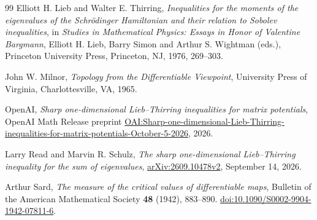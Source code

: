 \begin{thebibliography}{99}
Elliott H. Lieb and Walter E. Thirring,
\emph{Inequalities for the moments of the eigenvalues of the Schr\"odinger
Hamiltonian and their relation to Sobolev inequalities},
in \emph{Studies in Mathematical Physics: Essays in Honor of Valentine
Bargmann}, Elliott H. Lieb, Barry Simon and Arthur S. Wightman (eds.),
Princeton University Press, Princeton, NJ, 1976, 269--303.

John W. Milnor,
\emph{Topology from the Differentiable Viewpoint},
University Press of Virginia, Charlottesville, VA, 1965.

OpenAI,
\emph{Sharp one-dimensional Lieb--Thirring inequalities for matrix potentials},
OpenAI Math Release preprint
\href{https://github.com/openai/math/blob/main/preprints/Sharp-one-dimensional-Lieb-Thirring-inequalities-for-matrix-potentials-October-5-2026/sharp-matrix-lieb-thirring.pdf}{OAI:Sharp-one-dimensional-Lieb-Thirring-inequalities-for-matrix-potentials-October-5-2026},
2026.

Larry Read and Marvin R. Schulz,
\emph{The sharp one-dimensional Lieb--Thirring inequality for the sum
of eigenvalues},
\href{https://arxiv.org/abs/2609.10478v2}{arXiv:2609.10478v2},
September 14, 2026.

Arthur Sard,
\emph{The measure of the critical values of differentiable maps},
Bulletin of the American Mathematical Society \textbf{48} (1942),
883--890.
\href{https://doi.org/10.1090/S0002-9904-1942-07811-6}{doi:10.1090/S0002-9904-1942-07811-6}.

\end{thebibliography}
